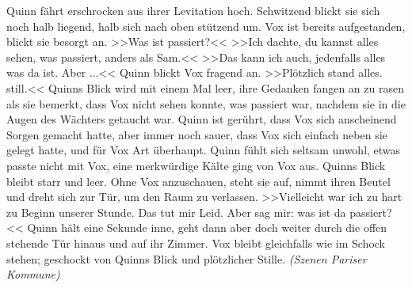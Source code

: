 Quinn fährt erschrocken aus ihrer Levitation hoch. Schwitzend blickt sie sich
noch halb liegend, halb sich nach oben stützend um. 
Vox ist bereits aufgestanden, blickt sie besorgt an. 
>>Was ist passiert?<< 
>>Ich dachte, du kannst alles sehen, was passiert, anders als Sam.<< 
>>Das kann ich auch, jedenfalls alles was da ist. Aber ...<<
Quinn blickt Vox fragend an. 
>>Plötzlich stand alles. still.<< 
Quinns Blick wird mit einem Mal leer, ihre Gedanken fangen an zu rasen als sie
bemerkt, dass Vox nicht sehen konnte, was passiert war, nachdem sie in die Augen
des Wächters getaucht war. 
Quinn ist gerührt, dass Vox sich anscheinend Sorgen gemacht hatte, aber immer
noch sauer, dass Vox sich einfach neben sie gelegt hatte, und für Vox Art
überhaupt.
Quinn fühlt sich seltsam unwohl, etwas passte nicht mit Vox, eine merkwürdige
Kälte ging von Vox aus. 
Quinns Blick bleibt starr und leer. 
Ohne Vox anzuschauen, steht sie auf, nimmt ihren Beutel und dreht sich zur Tür,
um den Raum zu verlassen. 
>>Vielleicht war ich zu hart zu Beginn unserer Stunde. 
Das tut mir Leid. 
Aber sag mir: was ist da passiert?<<
Quinn hält eine Sekunde inne, geht dann aber doch weiter durch die offen
stehende Tür hinaus und auf ihr Zimmer. 
Vox bleibt gleichfalls wie im Schock stehen; geschockt von Quinns
Blick und plötzlicher Stille. \emph{(Szenen Pariser Kommune)}\\\\
